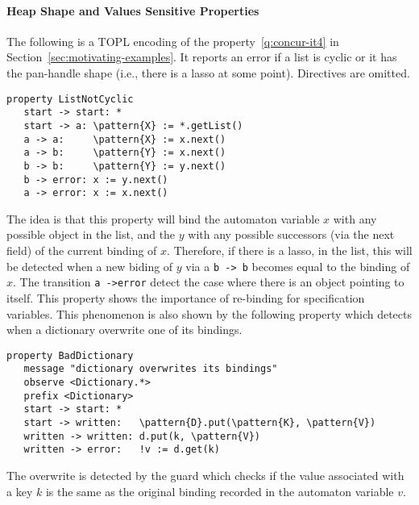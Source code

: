 \documentclass[9pt, preprint]{sigplanconf} %
\newcommand{\delimitVerbatim}{\par\nobreak\smallskip\noindent}
\newcommand{\pattern}[1]{\ensuremath{\mathtt{\underline{#1}}}}
\theoremstyle{definition}
\theoremstyle{remark}
\begin{document}
\paragraph{Heap Shape and Values Sensitive Properties}  %
The following is a TOPL encoding of the property~\eqref{q:concur-it4} in Section~\ref{sec:motivating-examples}.
It reports an error if a list is cyclic or it has the pan-handle shape (i.e.,
there is a lasso at some point). Directives are omitted.
%
\delimitVerbatim
\begin{Verbatim}[commandchars=\\\{\}]
 property ListNotCyclic
   start -> start: *
   start -> a: \pattern{X} := *.getList()
   a -> a:     \pattern{X} := x.next()
   a -> b:     \pattern{Y} := x.next()
   b -> b:     \pattern{Y} := y.next()
   b -> error: x := y.next()
   a -> error: x := x.next()
\end{Verbatim}
\delimitVerbatim
The idea is that this property will bind the automaton variable $x$ with any possible object in the list, and the $y$ with any possible successors (via the next field) of the current binding of $x$.
Therefore, if there is a lasso, in the list, this will be detected when a new biding of $y$ via a \texttt{b -> b} becomes equal to the binding of $x$.
The transition \texttt{a ->error} detect the case where there is an object pointing to itself. This property shows the importance of re-binding for specification variables. This phenomenon is also shown by  the following property which detects when a dictionary overwrite one of its bindings.
\delimitVerbatim
\begin{Verbatim}[commandchars=\\\{\}]
 property BadDictionary
   message "dictionary overwrites its bindings"
   observe <Dictionary.*>
   prefix <Dictionary>
   start -> start: *
   start -> written:   \pattern{D}.put(\pattern{K}, \pattern{V})
   written -> written: d.put(k, \pattern{V})
   written -> error:   !v := d.get(k)
\end{Verbatim}
\delimitVerbatim
The overwrite is detected by the guard which checks if the value associated with a key $k$ is the same as the original binding recorded in the automaton variable $v$.

\end{document}
